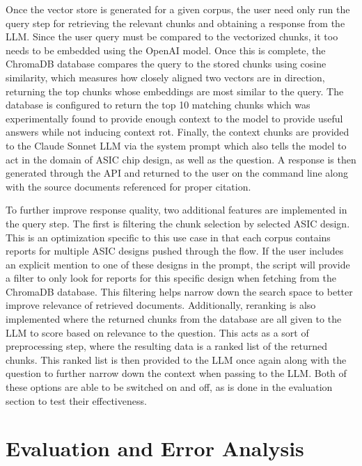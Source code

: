 \documentclass[conference]{IEEEtran}
\begin{document}
Once the vector store is generated for a given corpus, the user need only run the query step for retrieving the relevant chunks and obtaining a response from the LLM. Since the user query must be compared to the vectorized chunks, it too needs to be embedded using the OpenAI model. Once this is complete, the ChromaDB database compares the query to the stored chunks using cosine similarity, which measures how closely aligned two vectors are in direction, returning the top chunks whose embeddings are most similar to the query. The database is configured to return the top 10 matching chunks which was experimentally found to provide enough context to the model to provide useful answers while not inducing context rot. Finally, the context chunks are provided to the Claude Sonnet LLM via the system prompt which also tells the model to act in the domain of ASIC chip design, as well as the question. A response is then generated through the API and returned to the user on the command line along with the source documents referenced for proper citation.

To further improve response quality, two additional features are implemented in the query step. The first is filtering the chunk selection by selected ASIC design. This is an optimization specific to this use case in that each corpus contains reports for multiple ASIC designs pushed through the flow. If the user includes an explicit mention to one of these designs in the prompt, the script will provide a filter to only look for reports for this specific design when fetching from the ChromaDB database. This filtering helps narrow down the search space to better improve relevance of retrieved documents. Additionally, reranking is also implemented where the returned chunks from the database are all given to the LLM to score based on relevance to the question. This acts as a sort of preprocessing step, where the resulting data is a ranked list of the returned chunks. This ranked list is then provided to the LLM once again along with the question to further narrow down the context when passing to the LLM. Both of these options are able to be switched on and off, as is done in the evaluation section to test their effectiveness.

\section{Evaluation and Error Analysis}
\end{document}
